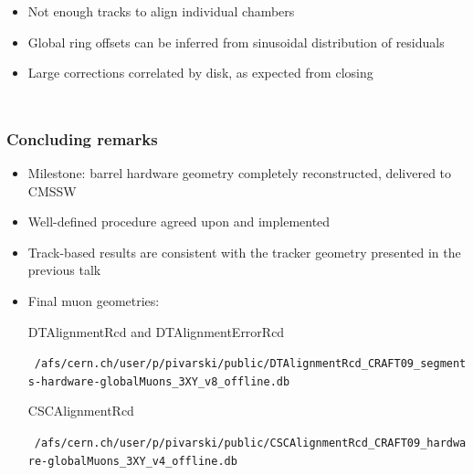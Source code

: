 \documentclass[compress]{beamer}
\begin{document}
\begin{frame}
\begin{columns}
\begin{itemize}
\item Not enough tracks to align individual chambers
\item Global ring offsets can be inferred from sinusoidal distribution of residuals
\item Large corrections correlated by disk, as expected from closing
\end{itemize}
\end{columns}
\end{frame}

\begin{frame}
\frametitle{Concluding remarks}
\begin{itemize}\setlength{\itemsep}{0.5 cm}
\item Milestone: barrel hardware geometry completely reconstructed, delivered to CMSSW
\item Well-defined procedure agreed upon and implemented
\item Track-based results are consistent with the tracker geometry presented in the previous talk
\item Final muon geometries:

\vspace{0.5 cm}
DTAlignmentRcd and DTAlignmentErrorRcd

\mbox{\hspace{-1.25 cm} \tiny \tt /afs/cern.ch/user/p/pivarski/public/DTAlignmentRcd\_CRAFT09\_segments-hardware-globalMuons\_3XY\_v8\_offline.db}

CSCAlignmentRcd

\mbox{\hspace{-1.25 cm} \tiny \tt /afs/cern.ch/user/p/pivarski/public/CSCAlignmentRcd\_CRAFT09\_hardware-globalMuons\_3XY\_v4\_offline.db}

\end{itemize}
\label{numpages}
\end{frame}
\end{document}
